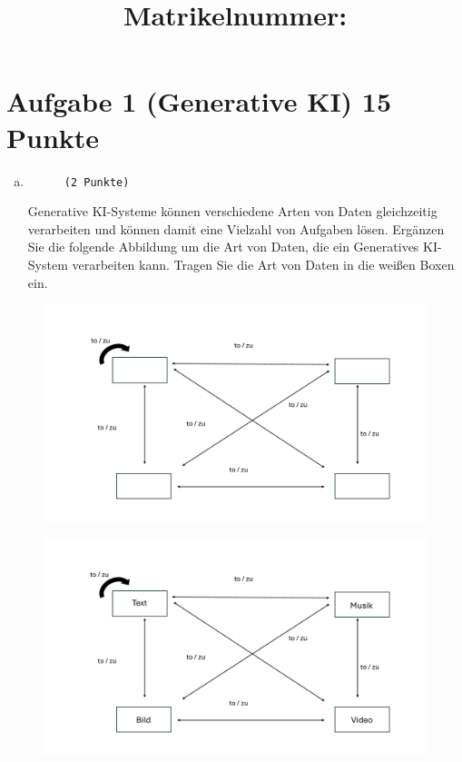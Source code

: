 \documentclass[12pt, ngerman]{AssignmentClass}
\title{Matrikelnummer:} %
\begin{document}
\section*{Aufgabe 1 (Generative KI) \hfill 15 Punkte}

    \begin{enumerate}[a)]
		\item 
			\begin{minipage}[t]{\linewidth}
				\vspace{-0.61em}
				\begin{figure} 
					\raggedleft
					\texttt{(2 Punkte)}
				\end{figure}
                Generative KI-Systeme können verschiedene Arten von Daten gleichzeitig verarbeiten und können damit eine Vielzahl von Aufgaben lösen. Ergänzen Sie die folgende Abbildung um die Art von Daten, die ein Generatives KI-System verarbeiten kann. Tragen Sie die Art von Daten in die weißen Boxen ein.
			\end{minipage}
	\end{enumerate}
    
    \begin{figure}[h]
        \centering
        \includegraphics[width=1\linewidth]{media/Aufgabe 1/Aufgabe1.pdf}
        \label{fig:Aufgabe1}
    \end{figure}

	\begin{solution}
        \begin{figure}[h]
            \centering
            \includegraphics[width=\linewidth]{media/Aufgabe 1/Aufgabe1-Loesung.pdf}
            \label{fig:Aufgabe1-Loesung}
        \end{figure}
	\end{solution}
\end{document}
